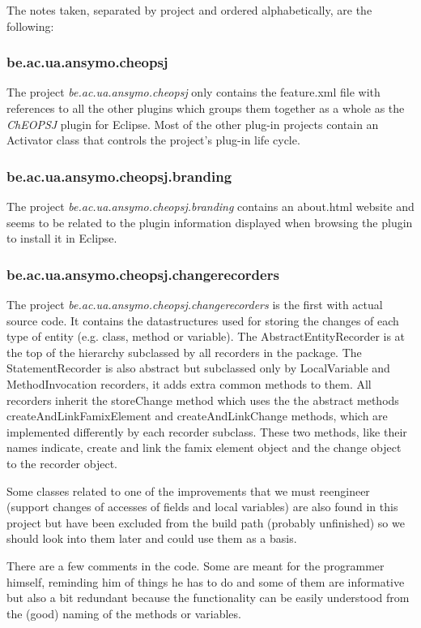 \documentclass[a4paper]{article}
\begin{document}
The notes taken, separated by project and ordered alphabetically, are the following:

\subsubsection{be.ac.ua.ansymo.cheopsj}
The project \emph{be.ac.ua.ansymo.cheopsj} only contains the feature.xml file with references to all the other plugins which groups them together as a whole as the \emph{ChEOPSJ} plugin for Eclipse. Most of the other plug-in projects contain an Activator class that controls the project's plug-in life cycle.

\subsubsection{be.ac.ua.ansymo.cheopsj.branding}
The project \emph{be.ac.ua.ansymo.cheopsj.branding} contains an about.html website and seems to be related to the plugin information displayed when browsing the plugin to install it in Eclipse.

\subsubsection{be.ac.ua.ansymo.cheopsj.changerecorders}
The project \emph{be.ac.ua.ansymo.cheopsj.changerecorders} is the first with actual source code. It contains the datastructures used for storing the changes of each type of entity (e.g. class, method or variable).
The AbstractEntityRecorder is at the top of the hierarchy subclassed by all recorders in the package. The StatementRecorder is also abstract but subclassed only by LocalVariable and MethodInvocation recorders, it adds extra common methods to them. All recorders inherit the storeChange method which uses the the abstract methods createAndLinkFamixElement and createAndLinkChange methods, which are implemented differently by each recorder subclass. These two methods, like their names indicate, create and link the famix element object and the change object to the recorder object.

Some classes related to one of the improvements that we must reengineer (support changes of accesses of fields and local variables) are also found in this project but have been excluded from the build path (probably unfinished) so we should look into them later and could use them as a basis.

There are a few comments in the code. Some are meant for the programmer himself, reminding him of things he has to do and some of them are informative but also a bit redundant because the functionality can be easily understood from the (good) naming of the methods or variables.
\end{document}
